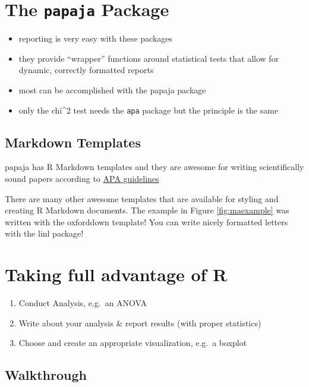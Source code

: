 \documentclass[
]{book}
\providecommand{\tightlist}{%
  \setlength{\itemsep}{0pt}\setlength{\parskip}{0pt}}
\begin{document}
\section{\texorpdfstring{The \texttt{papaja} Package}{The papaja Package}}\label{the-papaja-package}

\begin{itemize}
\item
  reporting is very easy with these packages
\item
  they provide ``wrapper'' functions around statistical tests that allow for dynamic, correctly formatted reports
\item
  most can be accomplished with the papaja package
\item
  only the chi\^{}2 test needs the \texttt{apa} package but the principle is the same
\end{itemize}

\subsection{Markdown Templates}\label{markdown-templates}

papaja has R Markdown templates and they are awesome for writing scientifically sound papers according to \href{https://apastyle.apa.org/style-grammar-guidelines}{APA guidelines}

There are many other awesome templates that are available for styling and creating R Markdown documents.
The example in Figure \ref{fig:maexample} was written with the oxforddown template!
You can write nicely formatted letters with the linl package!

\section{Taking full advantage of R}\label{taking-full-advantage-of-r}

\begin{enumerate}
\def\labelenumi{\arabic{enumi}.}
\tightlist
\item
  Conduct Analysis, e.g.~an ANOVA
\item
  Write about your analysis \& report results (with proper statistics)
\item
  Choose and create an appropriate visualization, e.g.~a boxplot
\end{enumerate}

\subsection{Walkthrough}\label{walkthrough}
\end{document}

